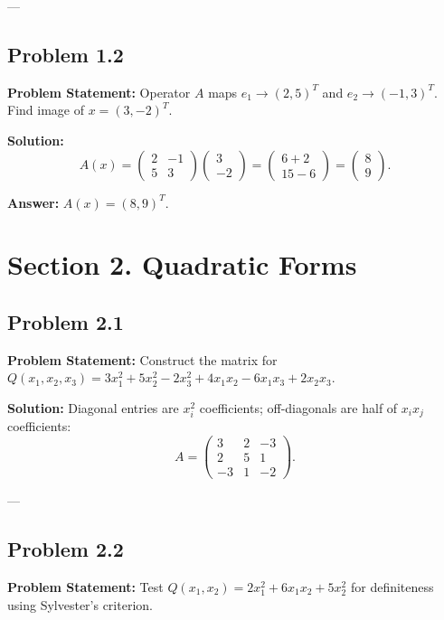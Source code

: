 \documentclass[11pt, a4paper]{article}
\begin{document}
---

\subsection*{Problem 1.2}
\textbf{Problem Statement:} Operator $A$ maps $e_1 \to (2,5)^T$ and $e_2 \to (-1,3)^T$. Find image of $x = (3,-2)^T$.

\textbf{Solution:}
$$ A(x) = \begin{pmatrix} 2 & -1 \\ 5 & 3 \end{pmatrix} \begin{pmatrix} 3 \\ -2 \end{pmatrix} = \begin{pmatrix} 6 + 2 \\ 15 - 6 \end{pmatrix} = \begin{pmatrix} 8 \\ 9 \end{pmatrix}. $$

\textbf{Answer:} $A(x) = (8, 9)^T$.

\newpage

\section{Section 2. Quadratic Forms}

\subsection*{Problem 2.1}
\textbf{Problem Statement:} Construct the matrix for $Q(x_1, x_2, x_3) = 3x_1^2 + 5x_2^2 - 2x_3^2 + 4x_1x_2 - 6x_1x_3 + 2x_2x_3$.

\textbf{Solution:} Diagonal entries are $x_i^2$ coefficients; off-diagonals are half of $x_i x_j$ coefficients:
$$ A = \begin{pmatrix} 3 & 2 & -3 \\ 2 & 5 & 1 \\ -3 & 1 & -2 \end{pmatrix}. $$

---

\subsection*{Problem 2.2}
\textbf{Problem Statement:} Test $Q(x_1, x_2) = 2x_1^2 + 6x_1x_2 + 5x_2^2$ for definiteness using Sylvester's criterion.
\end{document}
